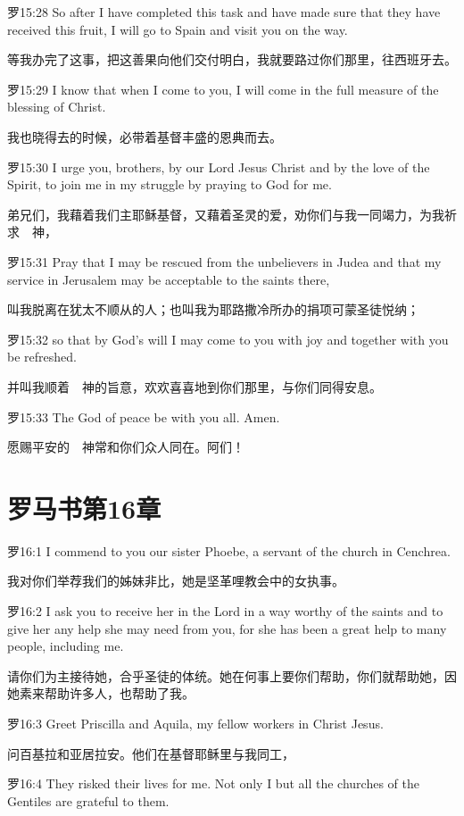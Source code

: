 \documentclass[a4paper,11pt,onecolumn,twoside]{ctexart}
\begin{document}
\begin{multicols}{2}
 罗15:28
 So after I have completed this task and have made sure that they have received this fruit, I will go to Spain and visit you on the way.

 等我办完了这事，把这善果向他们交付明白，我就要路过你们那里，往西班牙去。


 罗15:29
 I know that when I come to you, I will come in the full measure of the blessing of Christ.

 我也晓得去的时候，必带着基督丰盛的恩典而去。


 罗15:30
 I urge you, brothers, by our Lord Jesus Christ and by the love of the Spirit, to join me in my struggle by praying to God for me.

 弟兄们，我藉着我们主耶稣基督，又藉着圣灵的爱，劝你们与我一同竭力，为我祈求　神，


 罗15:31
 Pray that I may be rescued from the unbelievers in Judea and that my service in Jerusalem may be acceptable to the saints there,

 叫我脱离在犹太不顺从的人；也叫我为耶路撒冷所办的捐项可蒙圣徒悦纳；


 罗15:32
 so that by God's will I may come to you with joy and together with you be refreshed.

 并叫我顺着　神的旨意，欢欢喜喜地到你们那里，与你们同得安息。


 罗15:33
 The God of peace be with you all. Amen.

 愿赐平安的　神常和你们众人同在。阿们！


\section{ 罗马书第16章}
 罗16:1
 I commend to you our sister Phoebe, a servant of the church in Cenchrea.

 我对你们举荐我们的姊妹非比，她是坚革哩教会中的女执事。


 罗16:2
 I ask you to receive her in the Lord in a way worthy of the saints and to give her any help she may need from you, for she has been a great help to many people, including me.

 请你们为主接待她，合乎圣徒的体统。她在何事上要你们帮助，你们就帮助她，因她素来帮助许多人，也帮助了我。


 罗16:3
 Greet Priscilla and Aquila, my fellow workers in Christ Jesus.

 问百基拉和亚居拉安。他们在基督耶稣里与我同工，


 罗16:4
 They risked their lives for me. Not only I but all the churches of the Gentiles are grateful to them.


\end{multicols}
\end{document}
